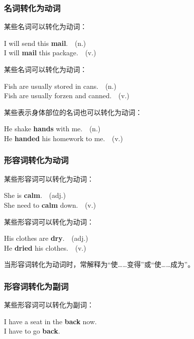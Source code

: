 \documentclass[UTF8]{ctexart}
\begin{document}
\newpage

\subsubsection{名词转化为动词}
    某些名词可以转化为动词：
    \begin{center}
        \large\ttfamily
        I will send this \textbf{mail}.~~(n.)\\[3mm]
        I will \textbf{mail} this package.~~(v.)\\[6mm]
    \end{center}
    某些名词可以转化为动词：
    \begin{center}
        \large\ttfamily
        Fish are usually stored in cans.~~(n.)\\[3mm]
        Fish are usually forzen and canned.~~(v.)\\[6mm]
    \end{center}
    某些表示身体部位的名词也可以转化为动词：
    \begin{center}
        \large\ttfamily
        He shake \textbf{hands} with me.~~(n.)\\[3mm]
        He \textbf{handed} his homework to me.~~(v.)\\[1mm]
    \end{center}\vspace{5pt}

\subsubsection{形容词转化为动词}
    某些形容词可以转化为动词：
    \begin{center}
        \large\ttfamily
        She is \textbf{calm}.~~(adj.)\\[3mm]
        She need to \textbf{calm} down.~~(v.)\\[6mm]
    \end{center}
    某些形容词可以转化为动词：
    \begin{center}
        \large\ttfamily
        His clothes are \textbf{dry}.~~(adj.)\\[3mm]
        He \textbf{dried} his clothes.~~(v.)\\[6mm]
    \end{center}
    当形容词转化为动词时，常解释为“使……变得”或“使……成为”。

\newpage

\subsubsection{形容词转化为副词}
    某些形容词可以转化为副词：
    \begin{center}
        \large\ttfamily
        I have a seat in the \textbf{back} now.\\[3mm]
        I have to go \textbf{back}.\\
    \end{center}\vspace{15pt}
\end{document}
